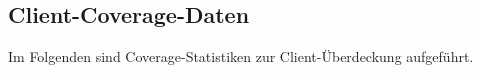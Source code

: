 \FloatBarrier
\subsection{Client-Coverage-Daten}

Im Folgenden sind Coverage-Statistiken zur Client-Überdeckung aufgeführt. 